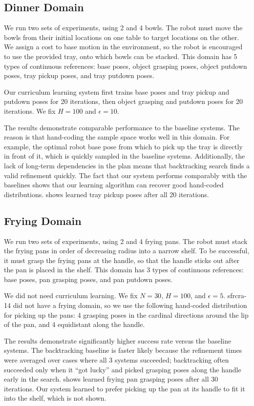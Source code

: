 \subsection{Dinner Domain}
We run two sets of experiments, using 2 and 4 bowls. The robot must
move the bowls from their initial locations on one table to target
locations on the other. We assign a cost to base motion in the
environment, so the robot is encouraged to use the provided tray, onto
which bowls can be stacked.  This domain has 5 types of continuous
references: base poses, object grasping poses, object putdown poses,
tray pickup poses, and tray putdown poses.

Our curriculum learning system first trains base poses and tray pickup
and putdown poses for 20 iterations, then object grasping and putdown
poses for 20 iterations. We fix $H = 100$ and $\epsilon = 10$.

The results demonstrate comparable performance to the baseline
systems. The reason is that hand-coding the sample space works well in
this domain. For example, the optimal robot base pose from which to
pick up the tray is directly in front of it, which is quickly sampled
in the baseline systems. Additionally, the lack of long-term
dependencies in the plan means that backtracking search finds a valid
refinement quickly. The fact that our system performs comparably with
the baselines shows that our learning algorithm can recover good
hand-coded distributions.   shows learned tray
pickup poses after all 20 iterations.

\subsection{Frying Domain}
We run two sets of experiments, using 2 and 4 frying pans. The robot
must stack the frying pans in order of decreasing radius into a narrow
shelf. To be successful, it must grasp the frying pans at the handle,
so that the handle sticks out after the pan is placed in the
shelf. This domain has 3 types of continuous references: base poses,
pan grasping poses, and pan putdown poses. 

We did not need curriculum learning. We fix $N = 30$, $H = 100$, and
$\epsilon = 5$. {\sc sfrcra-14} did not have a frying domain, so we
use the following hand-coded distribution for picking up the pans: 4
grasping poses in the cardinal directions around the lip of the pan,
and 4 equidistant along the handle.

The results demonstrate significantly higher success rate versus the
baseline systems. The backtracking baseline is faster likely because
the refinement times were averaged over cases where all 3 systems
succeeded; backtracking often succeeded only when it ``got lucky'' and
picked grasping poses along the handle early in the
search.  shows learned frying pan grasping poses
after all 30 iterations. Our system learned to prefer picking up the
pan at its handle to fit it into the shelf, which is not shown.






